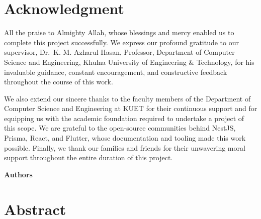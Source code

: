 \documentclass[12pt,a4paper]{report}
\begin{document}
\chapter*{Acknowledgment}
\thispagestyle{plain}

\noindent All the praise to Almighty Allah, whose blessings and mercy enabled us to complete
this project successfully. We express our profound gratitude to our supervisor, Dr.\
K. M. Azharul Hasan, Professor, Department of Computer Science and Engineering, Khulna
University of Engineering \& Technology, for his invaluable guidance, constant
encouragement, and constructive feedback throughout the course of this work.

We also extend our sincere thanks to the faculty members of the Department of Computer
Science and Engineering at KUET for their continuous support and for equipping us with
the academic foundation required to undertake a project of this scope. We are grateful
to the open-source communities behind NestJS, Prisma, React, and Flutter, whose
documentation and tooling made this work possible. Finally, we thank our families and
friends for their unwavering moral support throughout the entire duration of this project.

\vspace{24pt}
\hfill{\fontsize{12}{18}\bfseries\selectfont Authors}
\clearpage

\chapter*{Abstract}
\thispagestyle{plain}
\end{document}
